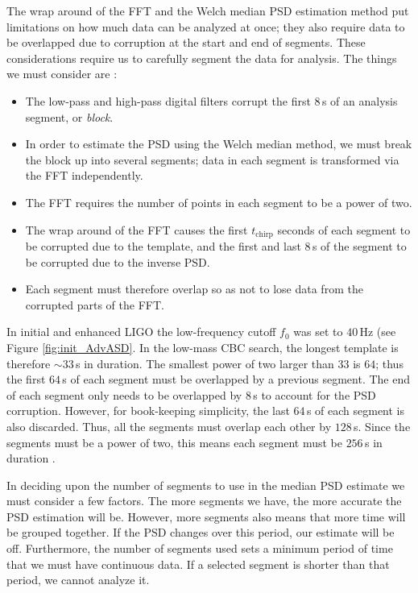 The wrap around of the \ac{FFT} and the Welch median \ac{PSD} estimation method
put limitations on how much data can be analyzed at once; they also require
data to be overlapped due to corruption at the start and end of segments. These
considerations require us to carefully segment the data for analysis. The
things we must consider are \cite{Brown}:
\begin{itemize}

\item{The low-pass and high-pass digital filters corrupt the first $8\,$s of an
analysis segment, or \emph{block}.}

\item{In order to estimate the \ac{PSD} using the Welch median method, we must
break the block up into several segments; data in each segment is transformed
via the \ac{FFT} independently.}

\item{The \ac{FFT} requires the number of points in each segment to be a power
of two.}

\item{The wrap around of the \ac{FFT} causes the first $t_{\mathrm{chirp}}$
seconds of each segment to be corrupted due to the template, and the first and
last $8\,$s of the segment to be corrupted due to the inverse \ac{PSD}.}

\item{Each segment must therefore overlap so as not to lose data from the
corrupted parts of the \ac{FFT}.}

\end{itemize}
In initial and enhanced \ac{LIGO} the low-frequency cutoff $f_0$ was set to
$40\,$Hz (see Figure \ref{fig:init_AdvASD}. In the low-mass \ac{CBC} search,
the longest template is therefore $\sim33\,$s in duration. The smallest power
of two larger than $33$ is $64$; thus the first $64\,$s of each segment must be
overlapped by a previous segment. The end of each segment only needs to be
overlapped by $8\,$s to account for the \ac{PSD} corruption. However, for
book-keeping simplicity, the last $64\,$s of each segment is also discarded.
Thus, all the segments must overlap each other by $128\,$s. Since the segments
must be a power of two, this means each segment must be $256\,$s in duration
\cite{Brown}.

In deciding upon the number of segments to use in the median \ac{PSD} estimate
we must consider a few factors. The more segments we have, the more accurate
the \ac{PSD} estimation will be. However, more segments also means that more
time will be grouped together. If the \ac{PSD} changes over this period, our
estimate will be off. Furthermore, the number of segments used sets a minimum
period of time that we must have continuous data. If a selected segment is
shorter than that period, we cannot analyze it. 

